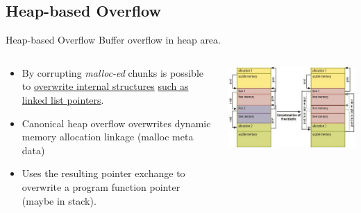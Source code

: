 \subsection{Heap-based Overflow}
\begin{frame}{Heap-based Overflow}
Buffer overflow in heap area.\\
\begin{columns}[T]
	\begin{column}{.47\textwidth}
\begin{itemize}
\item By corrupting \emph{malloc-ed} chunks is possible to \underline{overwrite internal structures} \underline{such as linked list pointers}.\\
\item Canonical heap overflow overwrites dynamic memory allocation linkage (malloc meta data)
\item Uses the resulting pointer exchange to overwrite a program function pointer (maybe in stack).
\end{itemize}
	\end{column}
	\begin{column}{.5\textwidth}
		\includegraphics[width=\textwidth]{imgs/heap.png}
		\label{fig:heap}
	\end{column}
\end{columns}
\end{frame}

